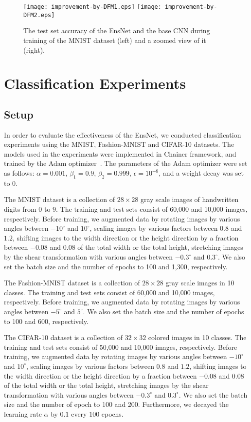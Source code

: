 \documentclass[a4j]{article}
\begin{document}
\begin{figure}[htp]
  \texttt{[image: improvement-by-DFM1.eps]}
  \texttt{[image: improvement-by-DFM2.eps]}
  \caption{The test set accuracy of the EnsNet and the base CNN during training of the MNIST dataset (left) and a zoomed view of it (right). }
  \label{fig:improvement-by-DFM}
\end{figure}


\section{Classification Experiments}
\label{sect:3}
\subsection{Setup}
In order to evaluate the effectiveness of the EnsNet, we conducted classification experiments using the MNIST, Fashion-MNIST and CIFAR-10 datasets. The models used in the experiments were implemented in Chainer framework\cite{chainer}, and trained by the Adam optimizer~\cite{Adam}. The parameters of the Adam optimizer were set as follows: $\alpha = 0.001$, $\beta_1 = 0.9$, $\beta_2 = 0.999$, $\epsilon = 10^{-8}$, and a weight decay was set to $0$.

The MNIST dataset is a collection of $28 \times 28$ gray scale images of handwritten digits from $0$ to $9$. The training and test sets consist of 60,000 and 10,000 images, respectively. Before training, we augmented data by rotating images by various angles between $-10^\circ$ and $10^\circ$, scaling images by various factors between $0.8$ and $1.2$, shifting images to the width direction or the height direction by a fraction between $-0.08$ and $0.08$ of the total width or the total height, stretching images by the shear transformation with various angles between $-0.3^\circ$ and $0.3^\circ$. We also set the batch size and the number of epochs to 100 and 1,300, respectively. 

The Fashion-MNIST dataset is a collection of $28 \times 28$ gray scale images in 10 classes. 
The training and test sets consist of 60,000 and 10,000 images, respectively. Before training, we augmented data by rotating images by various angles between $-5^\circ$ and $5^\circ$. We also set the batch size and the number of epochs to 100 and 600, respectively. 

The CIFAR-10 dataset is a collection of $32 \times 32$ colored images in 10 classes. The training and test sets consist of 50,000 and 10,000 images, respectively. Before training, we augmented data by rotating images by various angles between $-10^\circ$ and $10^\circ$, scaling images by various factors between $0.8$ and $1.2$, shifting images to the width direction or the height direction by a fraction between $-0.08$ and $0.08$ of the total width or the total height, stretching images by the shear transformation with various angles between $-0.3^\circ$ and $0.3^\circ$. We also set the batch size and the number of epoch to 100 and 200. Furthermore, we decayed the learning rate $\alpha$ by $0.1$ every 100 epochs.
\end{document}

